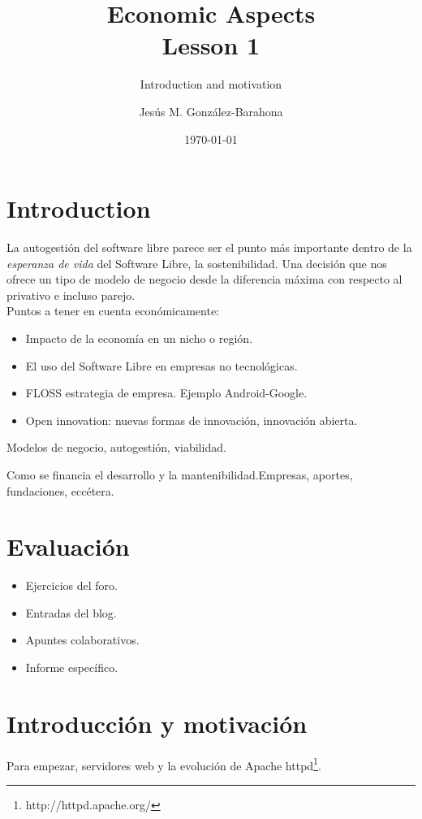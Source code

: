 \documentclass[11pt]{scrartcl}
\title{\textbf{Economic Aspects\\
                Lesson 1}}
\subtitle{Introduction and motivation}
\author{Jesús M. González-Barahona}
\date{\today}
\begin{document}
\maketitle

\section{Introduction}

La autogestión del software libre parece ser el punto más importante dentro de la \emph{esperanza de vida} del Software Libre, la sostenibilidad.
Una decisión que nos ofrece un tipo de modelo de negocio desde la diferencia máxima con respecto al privativo e incluso parejo.\\

Puntos a tener en cuenta económicamente:
\begin{itemize}
    \item Impacto de la economía en un nicho o región.
    \item El uso del Software Libre en empresas no tecnológicas.
    \item FLOSS estrategia de empresa. Ejemplo Android-Google.
    \item Open innovation: nuevas formas de innovación, innovación abierta.
\end{itemize}

Modelos de negocio, autogestión, viabilidad.

Como se financia el desarrollo y la mantenibilidad.Empresas, aportes, fundaciones, eccétera.

\section{Evaluación}

\begin{itemize}
    \item Ejercicios del foro.
    \item Entradas del blog.
    \item Apuntes colaborativos.
    \item Informe específico.
\end{itemize}

\section{Introducción y motivación}

Para empezar, servidores web y la evolución de Apache httpd\footnote{http://httpd.apache.org/}.
\end{document}
